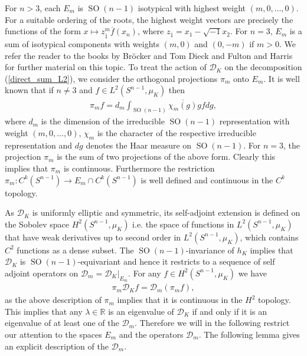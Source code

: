 \documentclass[12pt,twoside]{amsart}
\numberwithin{satz}{section}
\theoremstyle{definition}
\numberwithin{equation}{section}
\newcommand\R{\mathbb{R}}
\newcommand\SO{\operatorname{SO}}
\begin{document}
	For $n>3$, each $E_m$ is $\SO(n-1)$ isotypical with highest weight $(m,0,\dots,0)$. For a suitable ordering of the roots, the highest weight vectors are precisely the functions of the form $x\mapsto z_{\overline{1}}^m\overline{f}(x_n)$, where $z_{\overline{1}}=x_1-\sqrt{-1}x_2$. For $n=3$, $E_m$ is a sum of isotypical components with weights $(m,0)$ and $(0,-m)$ if $m>0$. We refer the reader to the books by Bröcker and Tom Dieck \cite{broeckertomdieck} and Fulton and Harris \cite{fultonharris} for further material on this topic. To treat the action of $\mathcal{D}_K$ on the decomposition (\ref{direct_sum_L2}), we consider the orthogonal projections $\pi_m$ onto $E_m$. It is well known that if $n\neq 3$ and $f\in L^2(S^{n-1},\mu_K)$ then
	\begin{align*}
		\pi_mf=d_m\int_{\SO(n-1)}\overline{\chi_m(g)}gf dg,
	\end{align*}
	where $d_m$ is the dimension of the irreducible $\SO(n-1)$ representation with weight $(m,0,\dots,0)$, $\chi_m$ is the character of the respective irreducible representation and $dg$ denotes the Haar measure on $\SO(n-1)$. For $n=3$, the projection $\pi_m$ is the sum of two projections of the above form. Clearly this implies that $\pi_m$ is continuous. Furthermore the restriction $\pi_m:C^k(S^{n-1})\to E_m\cap C^k(S^{n-1})$ is well defined and continuous in the $C^k$ topology.
	
	As $\mathcal{D}_K$ is uniformly elliptic and symmetric, its self-adjoint extension is defined on the Sobolev space $H^2(S^{n-1},\mu_K)$ i.e. the space of functions in $L^2(S^{n-1},\mu_K)$ that have weak derivatives up to second order in $L^2(S^{n-1},\mu_K)$, which contains $C^2$ functions as a dense subset. The $\SO(n-1)$-invariance of $h_K$ implies that $\mathcal{D}_K$ is $\SO(n-1)$-equivariant and hence it restricts to a sequence of self adjoint operators on $\mathcal{D}_m=\mathcal{D}_K|_{E_m}$. For any $f\in H^2(S^{n-1},\mu_K)$ we have 
	\begin{align*}
		\pi_m \mathcal{D}_Kf= \mathcal{D}_m(\pi_mf),
	\end{align*}
	as the above description of $\pi_m$ implies that it is continuous in the $H^2$ topology. This implies that any $\lambda\in\R$ is an eigenvalue of $\mathcal{D}_K$ if and only if it is an eigenvalue of at least one of the $\mathcal{D}_m$. Therefore we will in the following restrict our attention to the spaces $E_m$ and the operators $\mathcal{D}_m$. The following lemma gives an explicit description of the $\mathcal{D}_m$.
	
\end{document}
